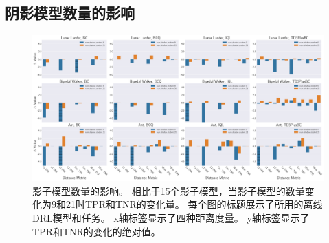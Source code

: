 \subsection{阴影模型数量的影响}
\label{sec:impact of shadow models' amount}
\begin{figure}[!ht]
    \centering
    \includegraphics[width=\hsize]{figure/orl_auditor/overall_result_20230126181443130-number_of_shadow_model.pdf}
    \caption{
    影子模型数量的影响。
    相比于15个影子模型，当影子模型的数量变化为9和21时TPR和TNR的变化量。
    每个图的标题展示了所用的离线DRL模型和任务。
    x轴标签显示了四种距离度量。
    y轴标签显示了TPR和TNR的变化的绝对值。
    } 

    \label{fig:impact of shadow models' amount}
\end{figure}

